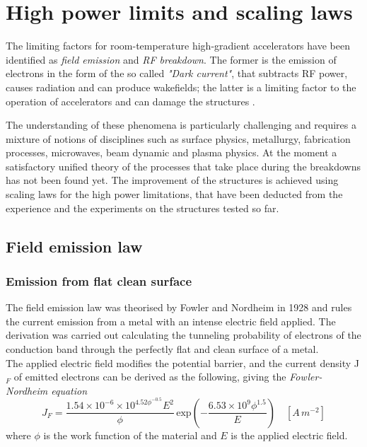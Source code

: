 \section[High power limits and scaling laws]{High power limits and scaling laws}

The limiting factors for room-temperature high-gradient accelerators have been identified as \textit{field emission} and \textit{RF breakdown}. The former is the emission of electrons in the form of the so called \textit{"Dark current"}, that subtracts RF power, causes radiation and can produce wakefields; the latter is a limiting factor to the operation of accelerators and can damage the structures \cite{Wang:1997ip}.

The understanding of these phenomena is particularly challenging and requires a mixture of notions of disciplines such as surface physics, metallurgy, fabrication processes, microwaves, beam dynamic and plasma physics. At the moment a satisfactory unified theory of the processes that take place during the breakdowns has not been found yet. The improvement of the structures is achieved using scaling laws for the high power limitations, that have been deducted  from the experience and the experiments on the structures tested so far. 


\subsection[Field emission law]{Field emission law}

\subsubsection{Emission from flat clean surface}

The field emission law was theorised by Fowler and Nordheim in 1928 and rules the current emission from a metal with an intense electric field applied. The derivation was carried out calculating the tunneling probability of electrons of the conduction band through the perfectly flat and clean surface of a metal. \\The applied electric field modifies the potential barrier, and the current density J$_F$ of emitted electrons can be derived as the following, giving the  \textit{Fowler-Nordheim equation} \cite{Fowler173}
\begin{equation}
J_F = \frac{ 1.54\times10^{-6} \times 10^{4.52\phi^{-0.5}} E^2}{  \phi } \, \text{exp} \left ( -\frac{6.53\times 10^9 \phi^{1.5}}{E} \right ) \quad [A\,m^{-2}]  \label{FNlaw}
\end{equation}
where $\phi$ is the work function of the material and $E$ is the applied electric field.


